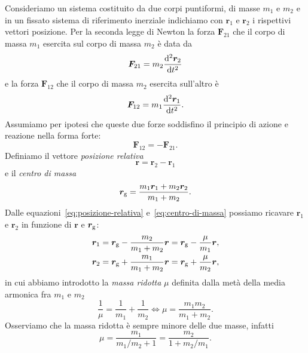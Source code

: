 Consideriamo un sistema costituito da due corpi puntiformi, di masse $m_1$ e
$m_2$ e in un fissato sistema di riferimento inerziale indichiamo con $\bm{r}_1$
e $\bm{r}_2$ i rispettivi vettori posizione. %
Per la seconda legge di Newton la forza $\bm{F}_{21}$ che il corpo di massa
$m_1$ esercita sul corpo di massa $m_2$ è data da
\begin{equation}
  \label{eq:f21}
  \bm{F}_{21} = m_2\toder[2]{\bm{r}_2}{t}
\end{equation}
e la forza $\bm{F}_{12}$ che il corpo di massa $m_2$ esercita sull'altro è
\begin{equation}
  \label{eq:f12}
  \bm{F}_{12} = m_1\toder[2]{\bm{r}_1}{t}.
\end{equation}
Assumiamo per ipotesi che queste due forze soddisfino il principio di azione e
reazione nella forma forte:
\begin{equation}
  \label{eq:azione-reazione}
  \bm{F}_{12} = -\bm{F}_{21}.
\end{equation}
Definiamo il vettore \emph{posizione relativa}
\begin{equation}
  \label{eq:posizione-relativa}
  \bm{r}=\bm{r}_2-\bm{r}_1
\end{equation}
e il \emph{centro di massa}
\begin{equation}
  \label{eq:centro-di-massa}
  \bm{r}_\textup{g} = \frac{m_1\bm{r}_1+m_2\bm{r}_2}{m_1+m_2}.
\end{equation}
Dalle equazioni~\eqref{eq:posizione-relativa} e~\eqref{eq:centro-di-massa}
possiamo ricavare $\bm{r}_1$ e $\bm{r}_2$ in funzione di $\bm{r}$ e
$\bm{r}_\textup{g}$:
\begin{subequations}
  \label{eq:r1-r2-posizione-relativa-cdm}
  \begin{align}
    \bm{r}_1 &= \bm{r}_\textup{g} - \frac{m_2}{m_1+m_2}\bm{r} =
    \bm{r}_\textup{g} - \frac{\mu}{m_1}\bm{r},\\
    \bm{r}_2 &= \bm{r}_\textup{g} + \frac{m_1}{m_1+m_2}\bm{r} =
    \bm{r}_\textup{g} + \frac{\mu}{m_2}\bm{r},
  \end{align}
\end{subequations}
in cui abbiamo introdotto la \emph{massa ridotta} $\mu$ definita dalla metà
della media armonica fra $m_1$ e $m_2$
\begin{equation}
  \frac{1}{\mu} = \frac{1}{m_1} + \frac{1}{m_2} \iff \mu=\frac{m_1m_2}{m_1+m_2}.
\end{equation}
Osserviamo che la massa ridotta è sempre minore delle due masse, infatti
\begin{equation}
  \mu =\frac{m_1}{m_1/m_2+1} = \frac{m_2}{1+m_2/m_1}.
\end{equation}
